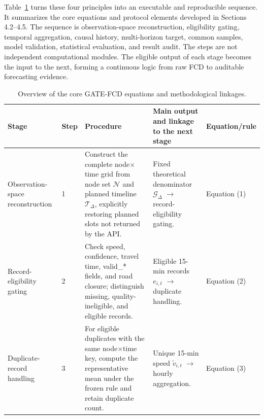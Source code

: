 \documentclass[pdflatex,sn-mathphys-num,iicol]{sn-jnl}
\begin{document}
Table~\ref{tab:gate-fcd-overview} turns these four principles into an executable and reproducible sequence. It summarizes the core equations and protocol elements developed in Sections 4.2--4.5. The sequence is observation-space reconstruction, eligibility gating, temporal aggregation, causal history, multi-horizon target, common samples, model validation, statistical evaluation, and result audit. The steps are not independent computational modules. The eligible output of each stage becomes the input to the next, forming a continuous logic from raw FCD to auditable forecasting evidence.



\begin{table}[!t]
\caption{Overview of the core GATE-FCD equations and methodological linkages.}
\label{tab:gate-fcd-overview}
\centering

\renewcommand{\arraystretch}{1.12}
\setlength{\tabcolsep}{3pt}
\scriptsize

\begin{tabular}{
|p{}
|p{}
|p{}
|p{}
|p{}|
}
\hline

\textbf{Stage}
&
\textbf{Step}
&
\textbf{Procedure}
&
\textbf{Main output and linkage to the next stage}
&
\textbf{Equation/rule}
\\
\hline

Observation-space reconstruction
&
1
&
Construct the complete node$\times$time grid from node set $\mathcal{N}$ and planned timeline $\mathcal{T}_{\Delta}$, explicitly restoring planned slots not returned by the API.
&
Fixed theoretical denominator $\mathcal{G}_{\Delta}$ $\rightarrow$ record-eligibility gating.
&
Equation (1)
\\
\hline

Record-eligibility gating
&
2
&
Check speed, confidence, travel time, valid\_* fields, and road closure; distinguish missing, quality-ineligible, and eligible records.
&
Eligible 15-min records $e_{i,t}$ $\rightarrow$ duplicate handling.
&
Equation (2)
\\
\hline

Duplicate-record handling
&
3
&
For eligible duplicates with the same node$\times$time key, compute the representative mean under the frozen rule and retain duplicate count.
&
Unique 15-min speed $\tilde{v}_{i,t}$ $\rightarrow$ hourly aggregation.
&
Equation (3)
\\
\hline


\end{tabular}
\end{table}
\end{document}
